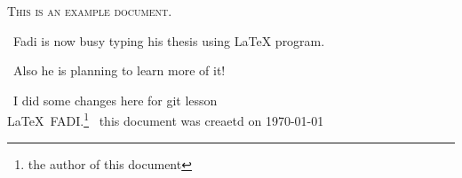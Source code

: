 \documentclass[12pt,a4,parskip=full]{scrreprt} %
\begin{document}
\textsc{This is an example document.}\par 
\ Fadi is now busy typing his thesis using LaTeX program.\par
\ Also he is planning to learn more of it!\par
\ I did some changes here for git lesson\\

\LaTeX\ {FADI.}\footnote{the author of this document} 
\ this document was creaetd on \today
\end{document}
